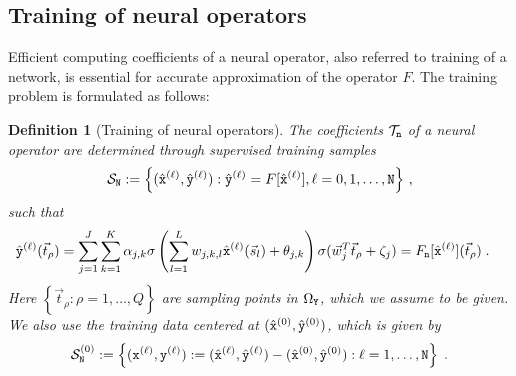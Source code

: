 \documentclass[10pt]{article}
\numberwithin{equation}{section}
\newtheorem{definition}[definition]{Definition}
\theoremstyle{nonumberplain}
\newcommand{\set}[1]{\left\{#1\right\}}
\newcommand{\bs}{\vec{s}}
\newcommand{\bt}{\vec{t}}
\newcommand{\bw}{{\vec{w}}}
\newcommand{\Y}{{\tt Y}}
\newcommand{\y}{{\tt y}}
\newcommand{\n}{{\tt n}}
\newcommand{\x}{{\tt x}}
\newcommand{\op}[1]{{F[#1]}}
\newcommand{\no}{{\tt N}}
\begin{document}
\subsection{Training of neural operators}
Efficient computing coefficients of a neural operator, also referred to training of a network, is essential for accurate approximation of the operator $F$. The training problem is formulated as follows:
\begin{definition}[Training of neural operators] 
The coefficients $\mathcal{T}_\n$ of a neural operator are determined through supervised training samples 
\begin{equation} \label{eq:S}
	\mathcal{S}_\no := \set{(\hat{\x}^{(\ell)},\hat{\y}^{(\ell)}) : \hat{\y}^{(\ell)} = \op{\hat{\x}^{(\ell)}} , \ell=0,1,\ldots,\no}\,,
\end{equation}
such that
\begin{equation} \label{eq:learn}
	\begin{aligned}
		\hat{\y}^{(\ell)}(\bt_\rho) 
		&= \sum_{j=1}^{J} \sum_{k=1}^{K} \alpha_{j,k} \sigma \left( \sum_{l=1}^{L} w_{j,k,l} \hat{\x}^{(\ell)}(\bs_l)+\theta_{j,k}\right) \sigma (\bw_j^T \bt_\rho +\zeta_j) = F_\n[\hat{\x}^{(\ell)}](\bt_\rho)\;.
	\end{aligned}
\end{equation}
Here $\set{\bt_\rho : \rho=1,\ldots,Q}$ are sampling points in $\Omega_\Y$, which we assume to be given. 
We also use the training data centered at $(\hat{\x}^{(0)},\hat{\y}^{(0)})$, which is given by 
\begin{equation} \label{eq:S0}
	\mathcal{S}_\no^{(0)} := \set{(\x^{(\ell)},\y^{(\ell)}) := (\hat{\x}^{(\ell)},\hat{\y}^{(\ell)}) -  (\hat{\x}^{(0)},\hat{\y}^{(0)}): \ell=1,\ldots,\no}\;.
\end{equation}
\end{definition}
\end{document}
